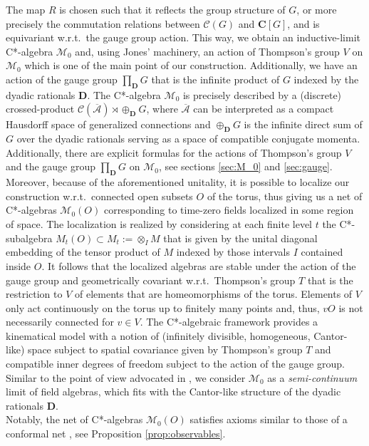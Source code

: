 \documentclass[a4paper,12pt]{amsart}
\numberwithin{equation}{section}
\theoremstyle{definition}
\newcommand{\oscrA}{{\overline{\mathscr{A}}}}
\newcommand{\scrC}{\mathscr C}
\newcommand{\C}{\mathbf C}
\newcommand{\D}{\mathbf D}
\newcommand{\scrM}{\mathscr M}
\newcommand{\ot}{\otimes}\newcommand{\otmin}{\otimes_{\text{min}}}
\begin{document}
The map $R$ is chosen such that it reflects the group structure of $G$, or more precisely the commutation relations between $\scrC(G)$ and $\C[G]$, and is equivariant w.r.t.~the gauge group action. This way, we obtain an inductive-limit C*-algebra $\scrM_0$ and, using Jones' machinery, an action of Thompson's group $V$ on $\scrM_0$ which is one of the main point of our construction.
Additionally, we have an action of the gauge group $\prod_\D G$ that is the infinite product of $G$ indexed by the dyadic rationals $\D$. 
The C*-algebra $\scrM_0$ is precisely described by a (discrete) crossed-product $\scrC(\oscrA)\rtimes \oplus_\D G$, where $\oscrA$ can be interpreted as a compact Hausdorff space of generalized connections \cite{Ashtekar-Lewandowski-95-Projective-Differential} and $\oplus_\D G$ is the infinite direct sum of $G$ over the dyadic rationals serving as a space of compatible conjugate momenta. 
Additionally, there are explicit formulas for the actions of Thompson's group $V$ and the gauge group $\prod_\D G$ on $\scrM_{0}$, see sections \ref{sec:M_0} and \ref{sec:gauge}.
Moreover, because of the aforementioned unitality, it is possible to localize our construction w.r.t.~connected open subsets $O$ of the torus, thus giving us a net of C*-algebras $\scrM_0(O)$ corresponding to time-zero fields localized in some region of space.
The localization is realized by considering at each finite level $t$ the C*-subalgebra $M_t(O)\subset M_t:= \ot_I M$ that is given by the unital diagonal embedding of the tensor product of $M$ indexed by those intervals $I$ contained inside $O$.
It follows that the localized algebras are stable under the action of the gauge group and geometrically covariant w.r.t.~Thompson's group $T$ that is the restriction to $V$ of elements that are homeomorphisms of the torus. Elements of $V$ only act continuously on the torus up to finitely many points and, thus, $vO$ is not necessarily connected for $v\in V$.
The C*-algebraic framework provides a kinematical model with a notion of (infinitely divisible, homogeneous, Cantor-like) space subject to spatial covariance given by Thompson's group $T$ and compatible inner degrees of freedom subject to the action of the gauge group. Similar to the point of view advocated in \cite{Jones17-Thompson}, we consider $\scrM_{0}$ as a \textit{semi-continuum} limit of field algebras, which fits with the Cantor-like structure of the dyadic rationals $\D$.\\[0.1cm]
Notably, the net of C*-algebras $\scrM_0(O)$ satisfies axioms similar to those of a conformal net \cite{Gabbiani-Froehlich-93-Conformal}, see Proposition \ref{prop:observables}.\\[0.25cm]
\end{document}
